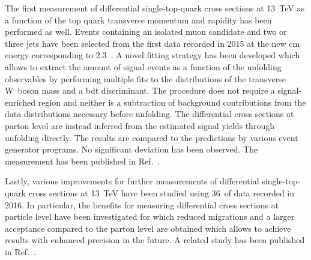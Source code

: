 The first measurement of differential single-top-quark cross sections at 13~TeV as a function of the top quark transverse momentum and rapidity has been performed as well. Events containing an isolated muon candidate and two or three jets have been selected from the first data recorded in 2015 at the new \acrlong{cm} energy corresponding to 2.3~\invfb. A novel fitting strategy has been developed which allows to extract the amount of signal events as a function of the unfolding observables by performing multiple fits to the distributions of the transverse W~boson mass and a \gls{bdt} discriminant. The procedure does not require a signal-enriched region and neither is a subtraction of background contributions from the data distributions necessary before unfolding. The differential cross sections at parton level are instead inferred from the estimated signal yields through unfolding directly. The results are compared to the predictions by various event generator programs. No significant deviation has been observed. The measurement has been published in Ref.~\cite{CMS-PAS-TOP-16-004}.

Lastly, various improvements for further measurements of differential single-top-quark cross sections at 13~TeV have been studied using 36~\invfb of data recorded in 2016. In particular, the benefits for measuring differential cross sections at particle level have been investigated for which reduced migrations and a larger acceptance compared to the parton level are obtained which allows to achieve results with enhanced precision in the future. A related study has been published in Ref.~\cite{particleStudies}.
